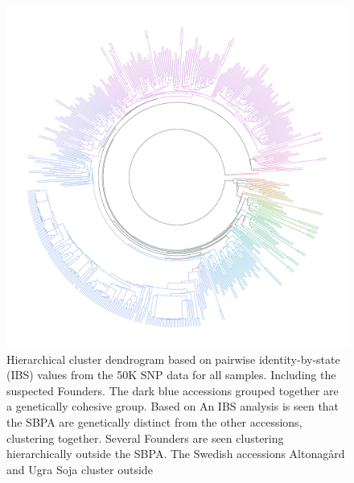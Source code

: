 \documentclass[9pt, twocolumn,twoside]{gsajnl}
\begin{document}
\begin{figure}[p]
\centering
\includegraphics[width=\linewidth]{rainbow.pdf}

\caption{Hierarchical cluster dendrogram based on pairwise identity-by-state (IBS) values from the 50K SNP data for all samples. Including the suspected Founders. The dark blue accessions grouped together are a genetically cohesive group. Based on An IBS analysis is seen that the SBPA are genetically distinct from the other accessions, clustering together. Several Founders are seen clustering hierarchically outside the SBPA. The Swedish accessions Altonagård and Ugra Soja cluster outside }%
\label{fig:dendo}
\end{figure}
\end{document}
